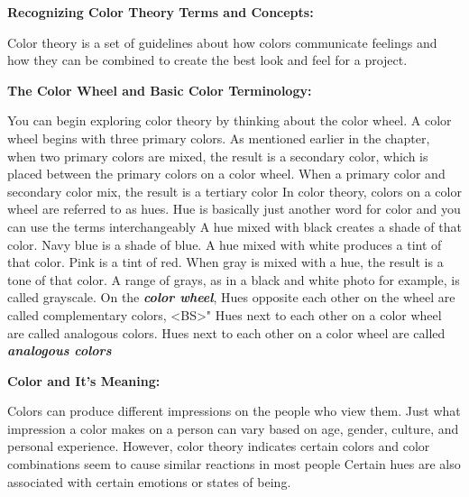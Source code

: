 \documentclass{report}
\begin{document}
          \bigbreak \noindent \bigbreak \noindent 
          \begin{Large}
            \noindent \textbf{Recognizing Color Theory Terms and Concepts:}
          \end{Large}
          \bigbreak \noindent 
           Color theory is a set of guidelines about how colors communicate feelings and how they can be combined to create the best look and feel for a project.
          \bigbreak \noindent \bigbreak \noindent 
          \begin{large}
            \textbf{The Color Wheel and Basic Color Terminology:}
          \end{large}
          \bigbreak \noindent 
            You can begin exploring color theory by thinking about the color wheel. A color wheel begins with three primary colors. As mentioned earlier in the chapter, when two primary colors are mixed, the result is a secondary color, which is placed between the primary colors on a color wheel. When a primary color and secondary color mix, the result is a tertiary color
          \bigbreak \noindent 
           In color theory, colors on a color wheel are referred to as hues. Hue is basically just another word for color and you can use the terms interchangeably
          \bigbreak \noindent \bigbreak \noindent  
          \bigbreak \noindent 
           A hue mixed with black creates a shade of that color. Navy blue is a shade of blue. A hue mixed with white produces a tint of that color. Pink is a tint of red.
          \bigbreak \noindent 
           When gray is mixed with a hue, the result is a tone of that color. A range of grays, as in a black and white photo for example, is called grayscale.
          \bigbreak \noindent 
           On the \textbf{\textit{color wheel}}, Hues opposite each other on the wheel are called complementary colors, <BS>" Hues next to each other on a color wheel are called analogous colors. Hues next to each other on a color wheel are called \textbf{\textit{analogous colors}}

          \bigbreak \noindent \bigbreak \noindent 
          \begin{Large}
            \textbf{Color and It's Meaning:}
          \end{Large}
          \bigbreak \noindent 
           Colors can produce different impressions on the people who view them. Just what impression a color makes on a person can vary based on age, gender, culture, and personal experience. However, color theory indicates certain colors and color combinations seem to cause similar reactions in most people
          \bigbreak \noindent 
           Certain hues are also associated with certain emotions or states of being.
\end{document}
